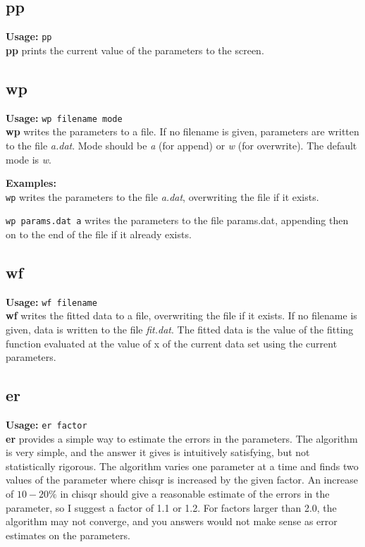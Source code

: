 \subsection{pp}     {\bf Usage: } {\tt  pp} \\

        {\bf pp} prints the current value of the parameters to the
 screen.

\subsection{wp}     {\bf Usage: } {\tt  wp filename mode} \\

        {\bf wp} writes the parameters to a file.  If no filename
 is given, parameters are written to the file {\em a.dat}.  Mode
 should be {\em a} (for append) or {\em w} (for overwrite).  The
 default mode is {\em w}.
 
 {\bf Examples:  } \\
 {\tt wp} writes the parameters to the file {\em a.dat}, overwriting
 the file if it exists.  

 {\tt wp params.dat a} writes the parameters to the file
 params.dat, appending then on to the end of the file if  it
 already exists.

\subsection{wf}     {\bf Usage: } {\tt  wf filename} \\

        {\bf wf} writes the fitted data to a file, overwriting the
 file if it exists.  If no filename is given, data is 
 written to the file {\em fit.dat}.  The fitted data is the 
 value of the fitting function evaluated at the value of x 
 of the current data set using the current parameters.

\subsection{er}     {\bf Usage: } {\tt  er factor} \\

        {\bf er} provides a simple way to estimate the errors in the
 parameters.  The algorithm is very simple, and the answer it
 gives is intuitively satisfying, but not statistically rigorous.
 The algorithm varies one parameter at a time and finds two
 values of the parameter where chisqr is increased by the given
 factor.  An increase of $10-20\%$ in chisqr should give a reasonable
 estimate of the errors in the parameter, so I suggest a factor
 of 1.1 or 1.2.  For factors larger than 2.0, the algorithm may
 not converge, and you answers would not make sense as error
 estimates on the parameters.



